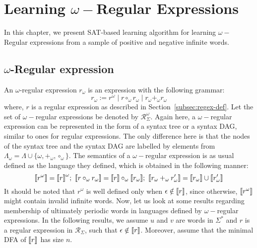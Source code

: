 \chapter{Learning $\omega-$Regular Expressions}


In this chapter, we present SAT-based learning algorithm for learning $\omega-$Regular expressions from a sample of positive and negative infinite words. 

\section{$\omega$-Regular expression}
An $\omega$-regular expression $r_\omega$ is an expression with the following grammar:
\begin{equation*}
    r_\omega:=r^\omega \mid r\circ_\omega r_\omega \mid r_\omega+_\omega r_\omega
\end{equation*}
where, $r$ is a regular expression as described in Section~\ref{subsec:regex-def}. Let the set of $\omega-$regular expressions be denoted by $\mathcal{R}_{\Sigma}^{\omega}$.
Again here, a $\omega-$regular expression can be represented in the form of a syntax tree or a syntax DAG, similar to ones for regular expressions. The only difference here is that the nodes of the syntax tree and the syntax DAG are labelled by elements from $\Lambda_\omega=\Lambda\cup\{\omega, +_\omega, \circ_\omega\}$.  The semantics of a $\omega-$regular expression is as usual defined as the language they defined, which is obtained in the following manner:
\begin{equation*}
    \sema{r^\omega}=\sema{r}^\omega;\ \sema{r\circ_\omega r_\omega}=\sema{r}\circ_\omega\sema{r_{\omega}};\ \sema{r_\omega+_{\omega}r_\omega^{\prime}}=\sema{r_\omega}\cup \sema{r_\omega^{\prime}}
\end{equation*}
It should be noted that $r^\omega$ is well defined only when $\epsilon\notin {\llbracket}r{\rrbracket}$, since otherwise, ${\llbracket}r^\omega{\rrbracket}$ might contain invalid infinite words.
Now, let us look at some results regarding membership of ultimately periodic words in languages defined by $\omega-$regular expressions. In the following results, we assume $u$ and $v$ are words in $\Sigma^*$ and $r$ is a regular expression in $\mathcal{R}_\Sigma$, such that $\epsilon\notin {\llbracket}r{\rrbracket}$. Moreover, assume that the minimal DFA of ${\llbracket}r{\rrbracket}$ has size $n$.

